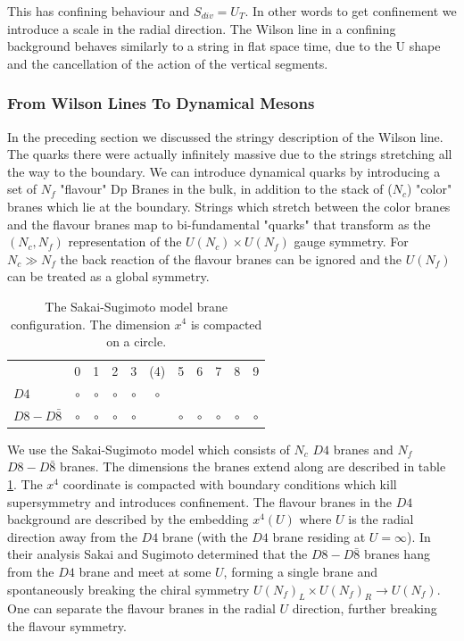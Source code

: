 \documentclass[11pt,a4paper]{article}
\begin{document}
This has confining behaviour and $S_{div}=U_T$. In other words to get confinement we introduce a scale in the radial direction. The Wilson line in a confining background behaves similarly to a string in flat space time, due to the U shape and the cancellation of the action of the vertical segments.

\FloatBarrier
\subsubsection{From Wilson Lines To Dynamical Mesons}

In the preceding section we discussed the stringy description of the Wilson line. The quarks there were actually infinitely massive due to the strings stretching all the way to the boundary. We can introduce dynamical quarks by introducing a set of $N_f$ "flavour" Dp Branes in the bulk, in addition to the stack of ($N_c$) "color" branes which lie at the boundary. Strings which stretch between the color branes and the flavour branes map to bi-fundamental "quarks" that transform as the $(N_c,N_f)$ representation of the $U(N_c)\times U(N_f)$ gauge symmetry. For $N_c\gg N_f$ the back reaction of the flavour branes can be ignored and the $U(N_f)$ can be treated as a global symmetry.

\begin{table}
\centering
\begin{tabular}{ l *{10}{c}}
 	& 0 & 1 & 2 & 3 & (4) & 5 & 6 & 7 & 8 & 9 \\
$D4$	 & $\circ$ & $\circ$ & $\circ$ & $\circ$ & $\circ$ &  &  &  &  & \\
$D8-D\bar{8}$	& $\circ$ & $\circ$ & $\circ$ & $\circ$ &  & $\circ$ & $\circ$ & $\circ$ & $\circ$ & $\circ$
\end{tabular}
\caption{The Sakai-Sugimoto model brane configuration. The dimension $x^4$ is compacted on a circle.}
\label{tab:Sakai-Sugimoto}
\end{table}

We use the Sakai-Sugimoto model \cite{Sakai04} which consists of $N_c$ $D4$ branes and $N_f$ $D8-D\bar{8}$ branes. The dimensions the branes extend along are described in table \ref{tab:Sakai-Sugimoto}. The $x^4$ coordinate is compacted with boundary conditions which kill supersymmetry and introduces confinement. The flavour branes in the $D4$ background are described by the embedding $x^4\left(U\right)$ where $U$ is the radial direction away from the $D4$ brane (with the $D4$ brane residing at $U=\infty$). In their analysis Sakai and Sugimoto determined that the $D8-D\bar{8}$ branes hang from the $D4$ brane and meet at  some $U$, forming a single brane and spontaneously breaking the chiral symmetry $U\left(N_f\right)_L\times U\left(N_f\right)_R\rightarrow U\left(N_f\right)$. One can separate the flavour branes in the radial $U$ direction, further breaking the flavour symmetry.
\end{document}
